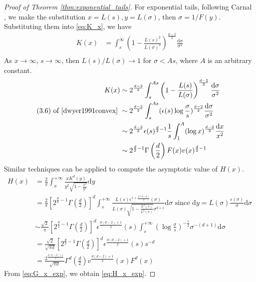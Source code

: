 \documentclass{aptpub}
\def\d{\mathrm{d}}
\begin{document}
\begin{proof}[Proof of Theorem \ref{thm:exponential_tails}]
For exponential tails, following Carnal \cite{carnal1970konvexe},
we make
the substitution $x=L(s), y=L(\sigma)$, then $\sigma=1/F(y)$.
Substituting them into \eqref{eq:K_x}, we have
\begin{align*}
    K(x)  & = \int_s^{\infty} \left(1-\frac{L(s)^2}{L(\sigma)^2} \right)^{\frac{d-2}{2}} \frac{\d \sigma}{\sigma^2} \\
\end{align*}
As $x\to \infty$, $s\to \infty$,
then $L(s)/L(\sigma) \to 1$ for $\sigma <As$,
where $A$ is an arbitrary constant.
\begin{align*}
     K(x)& \sim 2^{\frac{d-2}{2}} 
     \int_s^{As} \left(1-\frac{L(s)}{L(\sigma)}\right)^{\frac{d-2}{2}}
     \frac{\d \sigma}{\sigma^2} \\
     \textrm{ (3.6) of \cite{dwyer1991convex} }& 
     \sim  2^{\frac{d-2}{2}}  \int_s^{As} (\epsilon(s) \log\frac{\sigma}{s})^{\frac{d-2}{2}}\frac{\d \sigma}{\sigma^2}\\
     &\sim 2^{\frac{d-2}{2}} \epsilon(s)^{\frac{d}{2}-1} \frac{1}{s} \int_1^{A} (\log x )^{\frac{d-2}{2}}\frac{\d x}{x^2}\\
     & \sim 2^{\frac{d}{2}-1} \Gamma\left(\frac{d}{2}\right)F(x) v(x)^{\frac{d}{2}-1}    
\end{align*}
Similar techniques can be applied to compute the asymptotic value of $H(x)$.
\begin{align*}
    H(x) & = \frac{2}{\pi} \int_x^{+\infty}\frac{x K^d(y)}{y^2 \sqrt{1-\frac{x^2}{y^2}}}\d y\\
    &=\frac{2}{\pi}\left[2^{\frac{d}{2}-1} \Gamma\left(\frac{d}{2}\right)\right]^d
    \int_s^{+\infty}\frac{L(s) \epsilon^{1+\frac{d(d-2)}{2}}(\sigma)}{L(\sigma) \sqrt{1-\frac{L^2(s)}{L^2(\sigma)}}\sigma^{d+1}} \d \sigma
    \textrm{ since } \d y=L(\sigma)\frac{\epsilon(\sigma)}{\sigma}\d \sigma \\
    &\sim  \frac{\sqrt{2}}{\pi}
    \left[2^{\frac{d}{2}-1} \Gamma\left(\frac{d}{2}\right)\right]^d
    \epsilon^{\frac{d(d-2)+1}{2}}(s)
    \int_s^{+\infty} \left(\log\frac{\sigma}{s}
    \right)^{-\frac{1}{2}}
    \sigma^{-(d+1)}\d \sigma \\
    &= \frac{\sqrt{2}}{\sqrt{\pi d}}\left[2^{\frac{d}{2}-1} \Gamma\left(\frac{d}{2}\right)\right]^d
    \epsilon^{\frac{d(d-2)+1}{2}}(s)s^{-d}\\
    &= \frac{2^{\frac{d(d-2)+1}{2}}}{\sqrt{\pi d}}\Gamma^d\left(\frac{d}{2}\right)
    v^{\frac{d(d-2)+1}{2}}(x)F^d(x)
\end{align*}
From \eqref{eq:G_x_exp}, we obtain \eqref{eq:H_x_exp}.


\end{proof}
\end{document}
